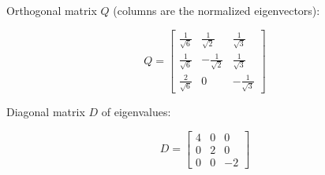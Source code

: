 \documentclass[12pt]{article}
\begin{document}
\begin{enumerate}[leftmargin=0em]
    Orthogonal matrix \( Q \) (columns are the normalized eigenvectors):
    
    \[
    Q =
    \begin{bmatrix}
    \frac{1}{\sqrt{6}} & \frac{1}{\sqrt{2}} & \frac{1}{\sqrt{3}} \\
    \frac{1}{\sqrt{6}} & -\frac{1}{\sqrt{2}} & \frac{1}{\sqrt{3}} \\
    \frac{2}{\sqrt{6}} & 0 & -\frac{1}{\sqrt{3}}
    \end{bmatrix}
    \]
    
    Diagonal matrix \( D \) of eigenvalues:
    
    \[
    D = \begin{bmatrix}
    4 & 0 & 0 \\
    0 & 2 & 0 \\
    0 & 0 & -2
    \end{bmatrix}
    \]
    
\end{enumerate}
\end{document}
